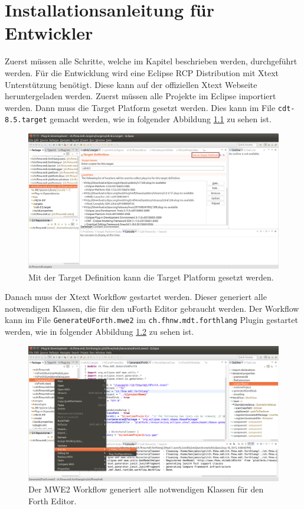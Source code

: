 \documentclass[listof=totocnumbered,bibliography=totocnumbered]{scrreprt}
\numberwithin{equation}{subsection}
\begin{document}
\newpage
\chapter{Installationsanleitung für Entwickler}

Zuerst müssen alle Schritte, welche im Kapitel  beschrieben werden, durchgeführt werden. Für die Entwicklung wird eine Eclipse RCP Distribution mit Xtext Unterstützung benötigt. Diese kann auf der offiziellen Xtext Webseite\cite{downloadxtext} heruntergeladen werden. Zuerst müssen alle Projekte im Eclipse importiert werden. Dann muss die Target Platform gesetzt werden. Dies kann im File \verb!cdt-8.5.target! gemacht werden, wie in folgender Abbildung \ref{fig:selecttarget} zu sehen ist.

\begin{figure}[H]
	\centering
		\includegraphics[scale=0.25]{targetplatform.png}
		\caption{Mit der Target Definition kann die Target Platform gesetzt werden.}
		\label{fig:selecttarget}
\end{figure}

Danach muss der Xtext Workflow gestartet werden. Dieser generiert alle notwendigen Klassen, die für den uForth Editor gebraucht werden. Der Workflow kann im File \verb!GenerateUForth.mwe2! im \verb!ch.fhnw.mdt.forthlang! Plugin gestartet werden, wie in folgender Abbildung \ref{fig:runmwe2} zu sehen ist.

\begin{figure}[H]
	\centering
		\includegraphics[scale=0.2]{runmwe2.png}
		\caption{Der MWE2 Workflow generiert alle notwendigen Klassen für den Forth Editor.}
		\label{fig:runmwe2}
\end{figure}
\end{document}
